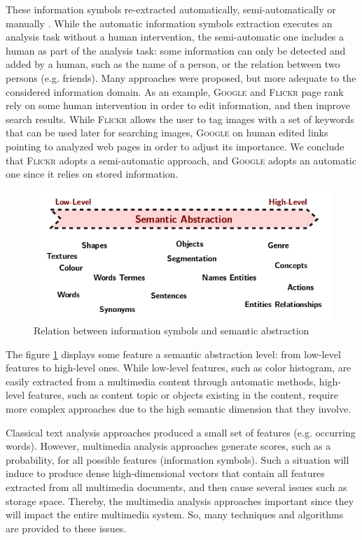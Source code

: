 		These information symbols re-extracted automatically, semi-automatically or manually 
		\citep{Zhang2012}. While the automatic information symbols extraction executes an analysis 
		task without a human intervention, the semi-automatic one includes a human as part of the analysis
		task: some information can only be detected and added by a human, such as the name of a person, 
		or the relation between two persons (e.g. friends). Many approaches were proposed, but more adequate
		to the considered information domain. As an example, \textsc{Google} \citep{Chen2011,Kumar2014}
		and \textsc{Flickr} \citep{Sigurbjoernsson2008,Ginsca2014} page rank rely on some human
		intervention in order to edit information, and then improve search results. While \textsc{Flickr} 
		allows the user to tag images with a set of keywords that can be used later for searching images, 
		\textsc{Google}  on human edited links pointing to analyzed web pages in order to adjust its 
		importance. We conclude that \textsc{Flickr} adopts a semi-automatic approach, and \textsc{Google}
		adopts an automatic one since it relies on stored information.

		\begin{figure}[ht]
			\centering
			\includegraphics[scale=0.7]{figures/state_fig5}
			\caption{Relation between information symbols and semantic abstraction}
			\label{state_fig5}
		\end{figure}

		The figure \ref{state_fig5} displays some feature  a semantic abstraction level: 
		from low-level features to high-level ones.  While low-level features, such as color histogram,
		are easily extracted from a multimedia content through automatic methods, high-level features, 
		such as content topic or objects existing in the content, require more complex approaches
		due to the high semantic dimension that they involve.

		Classical text analysis approaches produced a small set of features (e.g. occurring words). 
		However, multimedia analysis approaches generate scores, such as a probability, for all 
		possible features (information symbols). Such a situation will induce to produce dense 
		high-dimensional vectors that contain all features extracted from all multimedia documents, 
		and then cause several issues such as storage space. Thereby, the multimedia analysis approaches
		 important since they will impact the entire multimedia  system. 
		So, many techniques and algorithms are provided to  these issues.
		
